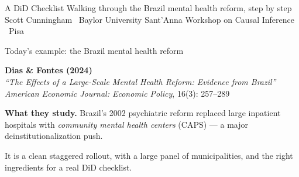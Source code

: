 \documentclass[aspectratio=169,12pt,t]{beamer}
\begin{document}

\codechellatitle
  {A DiD Checklist}
  {Walking through the Brazil mental health reform, step by step}
  {Scott Cunningham \textperiodcentered\ Baylor University}
  {Sant'Anna Workshop on Causal Inference \textperiodcentered\ Pisa}


\begin{frame}{Today's example: the Brazil mental health reform}
\vspace{0.5cm}

\textbf{Dias \& Fontes (2024)} \\
\textit{``The Effects of a Large-Scale Mental Health Reform: Evidence from Brazil''} \\
\textit{American Economic Journal: Economic Policy}, 16(3): 257--289

\vspace{0.7cm}

\textbf{What they study.} \;Brazil's 2002 psychiatric reform replaced large inpatient hospitals with \textit{community mental health centers} (CAPS) --- a major deinstitutionalization push.

\vspace{0.4cm}

 \;It is a clean staggered rollout, with a large panel of municipalities, and the right ingredients for a real DiD checklist.
\end{frame}
\end{document}
